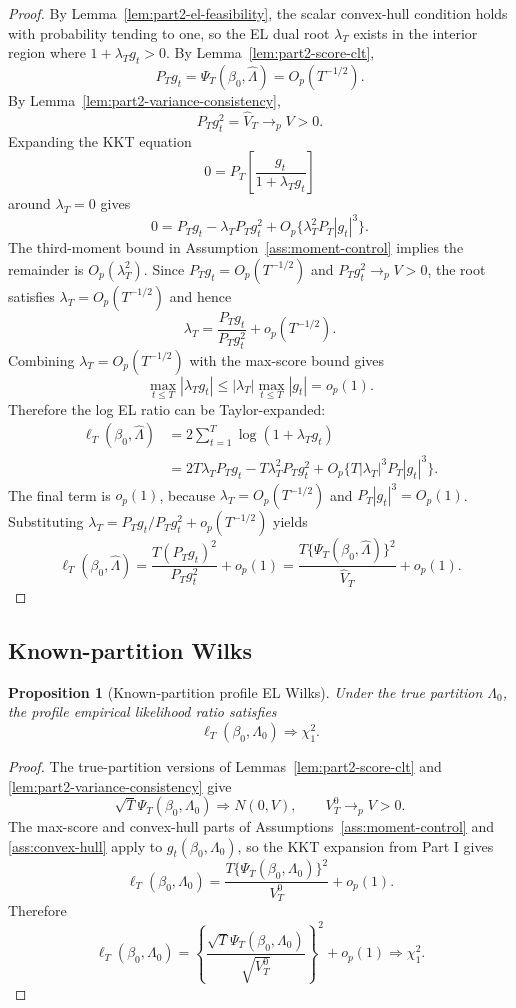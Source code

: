 \documentclass[12pt]{article}
\numberwithin{equation}{section}
\newtheorem{proposition}{Proposition}
\theoremstyle{definition}
\newcommand{\op}{o_p}
\newcommand{\Op}{O_p}
\begin{document}
\begin{proof}
By Lemma~\ref{lem:part2-el-feasibility}, the scalar convex-hull condition holds
with probability tending to one, so the EL dual root \(\lambda_T\) exists in the
interior region where \(1+\lambda_Tg_t>0\). By Lemma~\ref{lem:part2-score-clt},
\[
    P_Tg_t=\Psi_T(\beta_0,\widehat\Lambda)=\Op(T^{-1/2}).
\]
By Lemma~\ref{lem:part2-variance-consistency},
\[
    P_Tg_t^2=\widehat V_T\to_p V>0.
\]
Expanding the KKT equation
\[
    0=P_T\left[\frac{g_t}{1+\lambda_Tg_t}\right]
\]
around \(\lambda_T=0\) gives
\[
    0=P_Tg_t-\lambda_TP_Tg_t^2
      +O_p\{\lambda_T^2P_T|g_t|^3\}.
\]
The third-moment bound in Assumption~\ref{ass:moment-control} implies the
remainder is \(O_p(\lambda_T^2)\). Since \(P_Tg_t=\Op(T^{-1/2})\) and
\(P_Tg_t^2\to_p V>0\), the root satisfies \(\lambda_T=\Op(T^{-1/2})\) and hence
\[
    \lambda_T=\frac{P_Tg_t}{P_Tg_t^2}+\op(T^{-1/2}).
\]
Combining \(\lambda_T=\Op(T^{-1/2})\) with the max-score bound gives
\[
    \max_{t\le T}|\lambda_Tg_t|
    \le |\lambda_T|\max_{t\le T}|g_t|=\op(1).
\]
Therefore the log EL ratio can be Taylor-expanded:
\[
\begin{aligned}
    \ell_T(\beta_0,\widehat\Lambda)
    &=2\sum_{t=1}^T\log(1+\lambda_Tg_t) \\
    &=2T\lambda_TP_Tg_t-T\lambda_T^2P_Tg_t^2
      +O_p\{T|\lambda_T|^3P_T|g_t|^3\}.
\end{aligned}
\]
The final term is \(\op(1)\), because \(\lambda_T=\Op(T^{-1/2})\) and
\(P_T|g_t|^3=\Op(1)\). Substituting
\(\lambda_T=P_Tg_t/P_Tg_t^2+\op(T^{-1/2})\) yields
\[
    \ell_T(\beta_0,\widehat\Lambda)
    =\frac{T(P_Tg_t)^2}{P_Tg_t^2}+\op(1)
    =\frac{T\{\Psi_T(\beta_0,\widehat\Lambda)\}^2}{\widehat V_T}+\op(1).
\]
\end{proof}

\subsection{Known-partition Wilks}

\begin{proposition}[Known-partition profile EL Wilks]
\label{prop:part2-known-partition-wilks}
Under the true partition \(\Lambda_0\), the profile empirical likelihood ratio
satisfies
\[
    \ell_T(\beta_0,\Lambda_0)\Rightarrow\chi_1^2.
\]
\end{proposition}

\begin{proof}
The true-partition versions of Lemmas~\ref{lem:part2-score-clt} and
\ref{lem:part2-variance-consistency} give
\[
    \sqrt T\Psi_T(\beta_0,\Lambda_0)\Rightarrow N(0,V),
    \qquad
    V_T^0\to_p V>0.
\]
The max-score and convex-hull parts of Assumptions~\ref{ass:moment-control} and
\ref{ass:convex-hull} apply to \(g_t(\beta_0,\Lambda_0)\), so the KKT expansion
from Part I gives
\[
    \ell_T(\beta_0,\Lambda_0)
    =\frac{T\{\Psi_T(\beta_0,\Lambda_0)\}^2}{V_T^0}+\op(1).
\]
Therefore
\[
    \ell_T(\beta_0,\Lambda_0)
    =\left\{
      \frac{\sqrt T\Psi_T(\beta_0,\Lambda_0)}{\sqrt{V_T^0}}
     \right\}^2+
     \op(1)
    \Rightarrow\chi_1^2.
\]
\end{proof}
\end{document}
